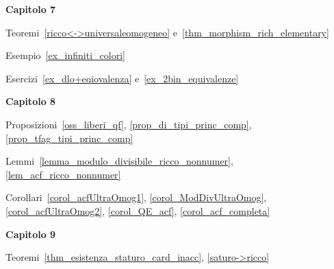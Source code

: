 \textbf{Capitolo 7}

Teoremi~\ref{ricco<->universaleomogeneo} e~\ref{thm_morphism_rich_elementary}

Esempio~\ref{ex_infiniti_colori} 

Esercizi~\ref{ex_dlo+eqiovalenza} e~\ref{ex_2bin_equivalenze}

\textbf{Capitolo 8}

Proposizioni~\ref{oss_liberi_qf}, \ref{prop_di_tipi_princ_comp}, \ref{prop_tfag_tipi_princ_comp}

Lemmi~\ref{lemma_modulo_divisibile_ricco_nonnumer}, \ref{lem_acf_ricco_nonnumer}

Corollari~\ref{corol_acfUltraOmog1}, \ref{corol_ModDivUltraOmog}, \ref{corol_acfUltraOmog2}, \ref{corol_QE_acf}, \ref{corol_acf_completa}

\textbf{Capitolo 9}

Teoremi~\ref{thm_esistenza_staturo_card_inacc}, \ref{saturo->ricco}